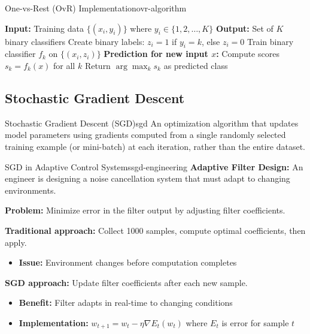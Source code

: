 \documentclass[12pt]{article}
\begin{document}
\begin{algorithmenv}{One-vs-Rest (OvR) Implementation}{ovr-algorithm}
\begin{algorithmic}[1]
\State \textbf{Input:} Training data $\{(x_i, y_i)\}$ where $y_i \in \{1,2,\ldots,K\}$
\State \textbf{Output:} Set of $K$ binary classifiers
    \State Create binary labels: $z_i = 1$ if $y_i = k$, else $z_i = 0$
    \State Train binary classifier $f_k$ on $\{(x_i, z_i)\}$
\EndFor
\State \textbf{Prediction for new input $x$:}
\State Compute scores $s_k = f_k(x)$ for all $k$
\State Return $\arg\max_k s_k$ as predicted class
\end{algorithmic}
\end{algorithmenv}

\subsection{Stochastic Gradient Descent}

\begin{definition}{Stochastic Gradient Descent (SGD)}{sgd}
An optimization algorithm that updates model parameters using gradients computed from a single randomly selected training example (or mini-batch) at each iteration, rather than the entire dataset.
\end{definition}

\begin{example}{SGD in Adaptive Control Systems}{sgd-engineering}
\textbf{Adaptive Filter Design:} An engineer is designing a noise cancellation system that must adapt to changing environments.

\textbf{Problem:} Minimize error in the filter output by adjusting filter coefficients.

\textbf{Traditional approach:} Collect 1000 samples, compute optimal coefficients, then apply.
\begin{itemize}
    \item \textbf{Issue:} Environment changes before computation completes
\end{itemize}

\textbf{SGD approach:} Update filter coefficients after each new sample.
\begin{itemize}
    \item \textbf{Benefit:} Filter adapts in real-time to changing conditions
    \item \textbf{Implementation:} $w_{t+1} = w_t - \eta \nabla E_t(w_t)$ where $E_t$ is error for sample $t$
\end{itemize}

\begin{center}
\end{center}
\end{example}
\end{document}
